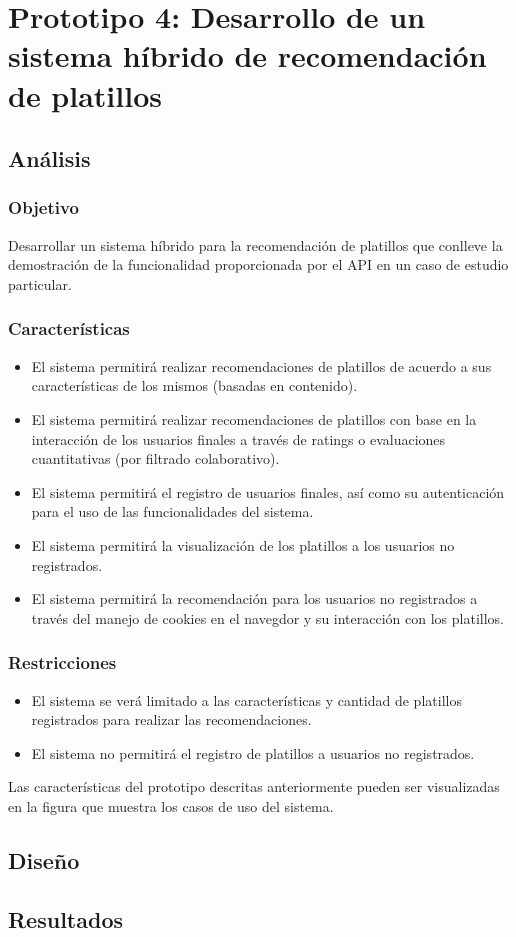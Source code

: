 \chapter{Prototipo 4: Desarrollo de un sistema híbrido de recomendación de platillos}
  \section{Análisis}
    \subsection{Objetivo}
      Desarrollar un sistema híbrido para la recomendación de platillos que conlleve la demostración de la funcionalidad proporcionada por el API en un caso de estudio particular.

    \subsection{Características}
    \begin{itemize}
      \item El sistema permitirá realizar recomendaciones de platillos de acuerdo a sus características de los mismos (basadas en contenido).
      \item El sistema permitirá realizar recomendaciones de platillos con base en la interacción de los usuarios finales a través de ratings o evaluaciones cuantitativas (por filtrado colaborativo).
      \item El sistema permitirá el registro de usuarios finales, así como su autenticación para el uso de las funcionalidades del sistema.
      \item El sistema permitirá la visualización de los platillos a los usuarios no registrados.
      \item El sistema permitirá la recomendación para los usuarios no registrados a través del manejo de cookies en el navegdor y su interacción con los platillos.
    \end{itemize}

    \subsection{Restricciones}
    \begin{itemize}
      \item El sistema se verá limitado a las características y cantidad de platillos registrados para realizar las recomendaciones.
      \item El sistema no permitirá el registro de platillos a usuarios no registrados.
    \end{itemize}

    Las características del prototipo descritas anteriormente pueden ser visualizadas en la figura que muestra los casos de uso del sistema.

  \section{Diseño}
  
  \section{Resultados}
   